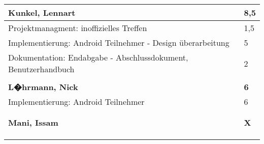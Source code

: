 \documentclass[a4paper,11pt]{scrartcl}
\begin{document}
\begin{longtable}{| p{13.8cm} | C{2.4cm} |}
	\textbf{Kunkel, Lennart} & \textbf{8,5}\\ %
	\hline

  Projektmanagment: inoffizielles Treffen
	&
  1,5
	\\
	\hline

  Implementierung: Android Teilnehmer - Design überarbeitung
	&
  5
	\\
	\hline

  Dokumentation: Endabgabe - Abschlussdokument, Benutzerhandbuch
	&
  2
	\\
	\hline


	&

	\\
	\hline
	\hline


	\textbf{L�hrmann, Nick} & \textbf{6}\\ %
	\hline

	Implementierung: Android Teilnehmer
	&
	6
	\\
	\hline


	&

	\\
	\hline


	&

	\\
	\hline


	\textbf{Mani, Issam} & \textbf{X}\\ %
	\hline


	&

	\\
	\hline


	&

	\\
	\hline


	&

	\\
	\hline


\end{longtable}
\end{document}
